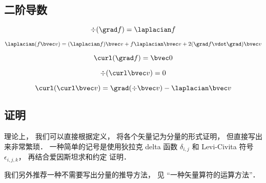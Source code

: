 \subsection{二阶导数}

\begin{equation}
\div (\grad f) = \laplacian f
\end{equation}

\begin{equation}\label{VopEq_eq5}
\laplacian (f \bvec v) = (\laplacian f)\bvec v + f \laplacian \bvec v + 2 (\grad f \vdot \grad) \bvec v
\end{equation}

\begin{equation}
\curl (\grad f) = \bvec 0
\end{equation}

\begin{equation}
\div (\curl \bvec v) = 0
\end{equation}

\begin{equation}
\curl(\curl \bvec v) = \grad(\div\bvec v) - \laplacian \bvec v
\end{equation}

\subsection{证明}
理论上， 我们可以直接根据定义， 将各个矢量记为分量的形式证明， 但直接写出来非常繁琐． 一种简单的记号是使用狄拉克 delta 函数 $\delta_{i,j}$ 和 Levi-Civita 符号 $\epsilon_{i,j,k}$， 再结合爱因斯坦求和约定%
证明．

我们另外推荐一种不需要写出分量的推导方法， 见 “一种矢量算符的运算方法”．
